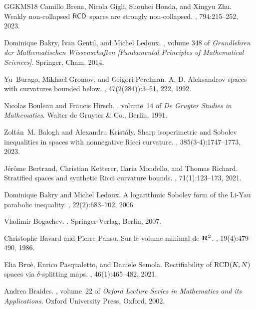 \documentclass[11pt]{article}
\numberwithin{equation}{section}
\begin{document}
{\begin{thebibliography}{GGKMS18}
Camillo Brena, Nicola Gigli, Shouhei Honda, and Xingyu Zhu.
\newblock Weakly non-collapsed {$\sf{RCD}$} spaces are strongly non-collapsed.
, 794:215--252, 2023.

Dominique Bakry, Ivan Gentil, and Michel Ledoux.
, volume
  348 of {\em Grundlehren der Mathematischen Wissenschaften [Fundamental
  Principles of Mathematical Sciences]}.
\newblock Springer, Cham, 2014.

Yu~Burago, Mikhael Gromov, and Grigori Perelman.
\newblock A. {D}. {A}leksandrov spaces with curvatures bounded below.
, 47(2(284)):3--51, 222, 1992.

Nicolas Bouleau and Francis Hirsch.
, volume~14 of
  {\em De Gruyter Studies in Mathematics}.
\newblock Walter de Gruyter \& Co., Berlin, 1991.

Zolt\'{a}n~M. Balogh and Alexandru Krist\'{a}ly.
\newblock Sharp isoperimetric and {S}obolev inequalities in spaces with
  nonnegative {R}icci curvature.
, 385(3-4):1747--1773, 2023.

J\'{e}r\^{o}me Bertrand, Christian Ketterer, Ilaria Mondello, and Thomas
  Richard.
\newblock Stratified spaces and synthetic {R}icci curvature bounds.
, 71(1):123--173, 2021.

Dominique Bakry and Michel Ledoux.
\newblock A logarithmic {S}obolev form of the {L}i-{Y}au parabolic inequality.
, 22(2):683--702, 2006.

Vladimir Bogachev.
.
\newblock Springer-Verlag, Berlin, 2007.

Christophe Bavard and Pierre Pansu.
\newblock Sur le volume minimal de {${\bf R}^2$}.
, 19(4):479--490, 1986.

Elia Bru\`e, Enrico Pasqualetto, and Daniele Semola.
\newblock Rectifiability of {${\rm RCD}(K,N)$}spaces via {$\delta$}-splitting
  maps.
, 46(1):465--482, 2021.

Andrea Braides.
, volume~22 of {\em Oxford
  Lecture Series in Mathematics and its Applications}.
\newblock Oxford University Press, Oxford, 2002.


\end{thebibliography}}
\end{document}

